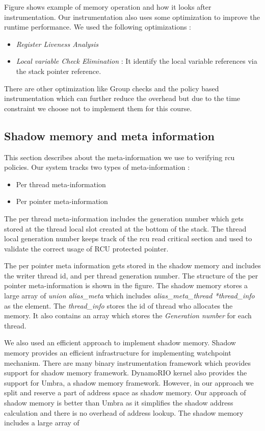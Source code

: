 Figure shows example of memory operation and how it looks after instrumentation. Our instrumentation also uses some optimization to improve the runtime performance. We used the following optimizations :  

\begin{itemize}
	\item \emph{Register Liveness Analysis}
	\item \emph{Local variable Check Elimination} :  It identify the local variable references via the stack pointer reference.
\end{itemize} 

There are other optimization like Group checks and the policy based instrumentation which can further reduce the overhead but due to the time constraint we choose not to implement them for this course.


\subsection{Shadow memory and meta information}
This section describes about the meta-information we use to verifying rcu policies. Our system tracks two types of meta-information :
\begin{itemize}
	\item Per thread meta-information
	\item Per pointer meta-information
\end{itemize} 

The per thread meta-information includes the generation number which gets stored at the thread local slot created at the bottom of the stack. The thread local generation number keeps track of the rcu read critical section and used to validate the correct usage of RCU protected pointer. 



The per pointer meta information gets stored in the shadow memory and includes the writer thread id, and per thread generation number. The structure of the per pointer meta-information is shown in the figure. The shadow memory stores a large array of \emph{union alias\_meta} which includes \emph{ alias\_meta\_thread *thread\_info} as the element. The \emph{thread\_info} stores the id of thread who allocates the memory. It also contains an array which stores the \emph{Generation number} for each thread. 

We also used an efficient approach to implement shadow memory. Shadow memory provides an efficient infrastructure for implementing watchpoint mechanism. There are many binary instrumentation framework which provides support for shadow memory framework. DynamoRIO kernel also provides the support for Umbra, a shadow memory framework. However, in our approach we split and reserve a part of address space as shadow memory. Our approach of shadow memory is better than Umbra as it simplifies the shadow address calculation and there is no overhead of address lookup. The shadow memory includes a large array of 

